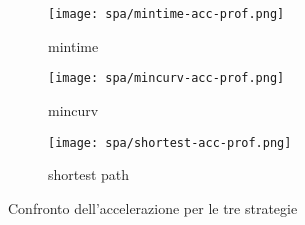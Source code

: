 \begin{figure}
	\begin{center}
	\begin{subfigure}[c]{0.3\textwidth}
		\texttt{[image: spa/mintime-acc-prof.png]}
		\caption{mintime}
	\end{subfigure}
	\begin{subfigure}[c]{0.3\textwidth}
		\texttt{[image: spa/mincurv-acc-prof.png]}
		\caption{mincurv}
	\end{subfigure}
	\begin{subfigure}[c]{0.383\textwidth}
		\texttt{[image: spa/shortest-acc-prof.png]}
		\caption{shortest path}
	\end{subfigure}
		\caption{Confronto dell'accelerazione per le tre strategie}
		\label{fig:spa-acc-comparison}
	\end{center}
\end{figure}

